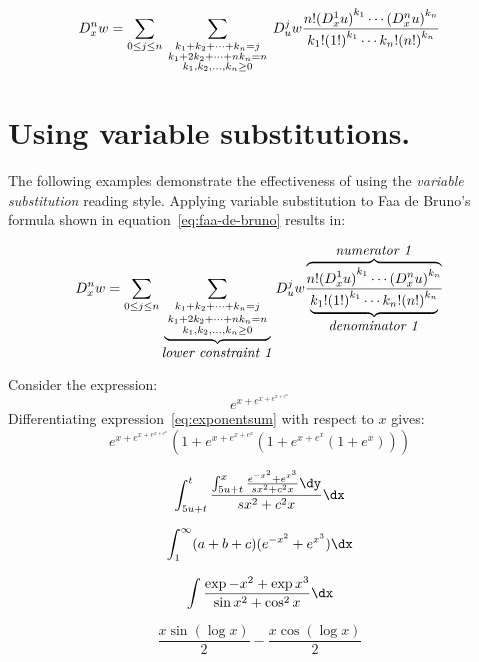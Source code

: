 \begin{equation}\label{eq:faa-de-bruno}
D^n_xw =
\sum_{0\le j\le n}
\sum_{\scriptstyle k_1+k_2+\cdots+k_n=j
\atop {\scriptstyle k_1+2k_2+\cdots+nk_n=n
\atop  {\scriptstyle k_1,k_2,\ldots,k_n\ge0
}}}
D^j_u w \frac{n! 
{(D^1_x u)}^{k_1}
\cdots {(D^n_x u)}^{k_n}
}
{k_1!{(1!)}^{k_1} \cdots k_n!{(n!)}^{k_n}} 
\end{equation}
\endlongsummation 


\section{Using variable substitutions.}
\activatevariablesubstitution

The following examples demonstrate the effectiveness of using the
{\em variable substitution\/}  reading style.
Applying variable substitution to Faa de Bruno's formula shown in
equation~\ref{eq:faa-de-bruno} results in:

\begin{equation}  \label{eq:faa-de-bruno-subst}
  D^n_xw = \sum_{0\le j\le n} \sum_{\underbrace{{\scriptstyle
        k_1+k_2+\cdots+k_n=j \atop {\scriptstyle
          k_1+2k_2+\cdots+nk_n=n \atop {\scriptstyle
            k_1,k_2,\ldots,k_n\ge0 }}}}_{\mbox{\em lower constraint
        1\/}}} D^j_u w
  \frac{\overbrace{n!  {(D^1_x u)}^{k_1} \cdots
      {(D^n_x u)}^{k_n}} ^{\mbox{\em numerator 1\/}}}
  {\underbrace{k_1!{(1!)}^{k_1}
    \cdots k_n!{(n!)}^{k_n}}_{\mbox{\em denominator 1\/}}}
\end{equation}

Consider the expression:
\begin{equation}
  e^{x+e^{x+e^{x+e^x}}} \label{eq:exponentsum}
\end{equation}
Differentiating  expression~\ref{eq:exponentsum} with respect to $x$
gives:
$$   e^{x + e^{x + e^{x + e^x}}} 
      (1 + e^{x + e^{x + e^x}}
      (1 + e^{x + e^x} (1 + e^x)))$$

        $$\int_{5u+t}^t 
        \frac{ \int_{5u+t}^x
          \frac{e^{-x^2} + e^{x^3} }
          {sx^2 + c^{2 }x } \dy}
{s  x^2 + c^2  x}  \dx$$


        $$ \int_1^\infty (a+b+c)(e^{-x^2} + e^{x^3})\dx$$
        
        $$ \int \frac{\exp{-x^2} + \exp {x^3} }{\sin x^2 + \cos^2 x}
        \dx$$
        


$$  \frac{x\sin(\log x)}{2} - \frac{x\cos(\log x)}{2}$$

